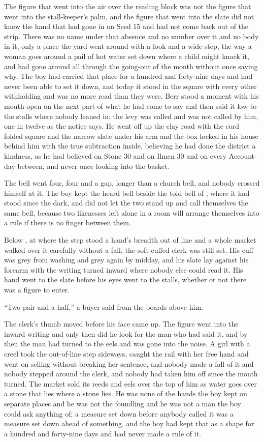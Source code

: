 The figure that went into the air over the reading block was not the figure that went into the stall-keeper's palm, and the figure that went into the slate did not know the hand that had gone in on Seed 15 and had not come back out of the strip. There was no name under that absence and no number over it and no body in it, only a place the yard went around with a look and a wide step, the way a woman goes around a pail of hot water set down where a child might knock it, and had gone around all through the going-out of the month without once saying why. The boy had carried that place for a hundred and forty-nine days and had never been able to set it down, and today it stood in the square with every other withholding and was no more read than they were. Berr stood a moment with his mouth open on the next part of what he had come to say and then said it low to the stalls where nobody leaned in: the levy was called and was not called by him, one in twelve as the notice says. He went off up the clay road with the cord folded square and the narrow slate under his arm and the box locked in his house behind him with the true subtraction inside, believing he had done the district a kindness, as he had believed on Stone 30 and on Ilmen 30 and on every Account-day between, and never once looking into the basket.

The bell went four, four and a gap, longer than a church bell, and nobody crossed himself at it. The boy kept the heard bell beside the told bell of , where it had stood since the dark, and did not let the two stand up and call themselves the same bell, because two likenesses left alone in a room will arrange themselves into a rule if there is no finger between them.

Below , at  where the step stood a hand's breadth out of line and a whole market walked over it carefully without a fall, the soft-cuffed clerk was still set. His cuff was grey from washing and grey again by midday, and his slate lay against his forearm with the writing turned inward where nobody else could read it. His hand went to the slate before his eyes went to the stalls, whether or not there was a figure to enter.

“Two pair and a half,” a buyer said from the boards above him.

The clerk's thumb moved before his face came up. The figure went into the inward writing and only then did he look for the man who had said it, and by then the man had turned to the eels and was gone into the noise. A girl with a creel took the out-of-line step sideways, caught the rail with her free hand and went on selling without breaking her sentence, and nobody made a fall of it and nobody stepped around the clerk, and nobody had taken him off since the month turned. The market sold its reeds and eels over the top of him as water goes over a stone that lies where a stone lies. He was none of the hands the boy kept on separate places and he was not the foundling and he was not a man the boy could ask anything of; a measure set down before anybody called it was a measure set down ahead of something, and the boy had kept that as a shape for a hundred and forty-nine days and had never made a rule of it.

